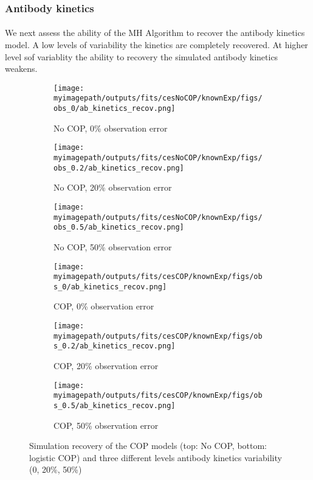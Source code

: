 \documentclass{article}
\newcommand{\myimagepath}{/Users/davidhodgson/Dropbox/Mac (3)/Documents/research/Rpackages/rjmc/}
\begin{document}
\subsubsection{Antibody kinetics}


\paragraph{}We next assess the ability of the MH Algorithm to recover the antibody kinetics model. A low levels of variability the kinetics are completely recovered. At higher level sof variablity the ability to recovery the simulated antibody kinetics weakens. 


\begin{figure}[H]
    \centering
    \begin{subfigure}{0.31\textwidth}
        \centering
        \texttt{[image: \\myimagepath/outputs/fits/cesNoCOP/knownExp/figs/obs\_0/ab\_kinetics\_recov.png]}
        \caption{No COP, 0\% observation error}
    \end{subfigure}
    \begin{subfigure}{0.31\textwidth}
        \centering
        \texttt{[image: \\myimagepath/outputs/fits/cesNoCOP/knownExp/figs/obs\_0.2/ab\_kinetics\_recov.png]}
        \caption{No COP, 20\% observation error}
    \end{subfigure}
    \begin{subfigure}{0.31\textwidth}
        \centering
        \texttt{[image: \\myimagepath/outputs/fits/cesNoCOP/knownExp/figs/obs\_0.5/ab\_kinetics\_recov.png]}
        \caption{No COP, 50\% observation error}
    \end{subfigure}
    
  \begin{subfigure}{0.31\textwidth}
        \centering
        \texttt{[image: \\myimagepath/outputs/fits/cesCOP/knownExp/figs/obs\_0/ab\_kinetics\_recov.png]}
        \caption{ COP, 0\% observation error}
    \end{subfigure}
    \begin{subfigure}{0.31\textwidth}
        \centering
        \texttt{[image: \\myimagepath/outputs/fits/cesCOP/knownExp/figs/obs\_0.2/ab\_kinetics\_recov.png]}
        \caption{ COP, 20\% observation error}
    \end{subfigure}
    \begin{subfigure}{0.31\textwidth}
        \centering
        \texttt{[image: \\myimagepath/outputs/fits/cesCOP/knownExp/figs/obs\_0.5/ab\_kinetics\_recov.png]}
        \caption{ COP, 50\% observation error}
    \end{subfigure}
    
    \caption{Simulation recovery of the COP models (top: No COP, bottom: logistic COP) and three different levels antibody kinetics variability (0, 20\%, 50\%)}
\end{figure}
\end{document}
